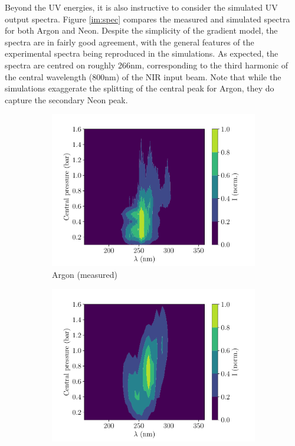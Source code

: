 \documentclass[a4paper]{jpconf}
\begin{document}
Beyond the UV energies, it is also instructive to consider the simulated UV output spectra. Figure \ref{im:spec} compares the measured and simulated spectra for both Argon and Neon. Despite the simplicity of the gradient model, the spectra are in fairly good agreement, with the general features of the experimental spectra being reproduced in the simulations. As expected, the spectra are centred on roughly 266nm, corresponding to the third harmonic of the central wavelength (800nm) of the NIR input beam. Note that while the simulations exaggerate the splitting of the central peak for Argon, they do capture the secondary Neon peak. \par  

\begin{figure}[h]
\centering
 \begin{subfigure}{0.49\textwidth}
        \includegraphics[width=\textwidth]{im/2d_spectra_pres_Ar_150mW_meas}
    \caption{Argon (measured)}
    \end{subfigure}
    \begin{subfigure}{0.49\textwidth}
        \includegraphics[width=\textwidth]{im/2d_Ar_sim}

\end{subfigure}
\end{figure}
\end{document}
